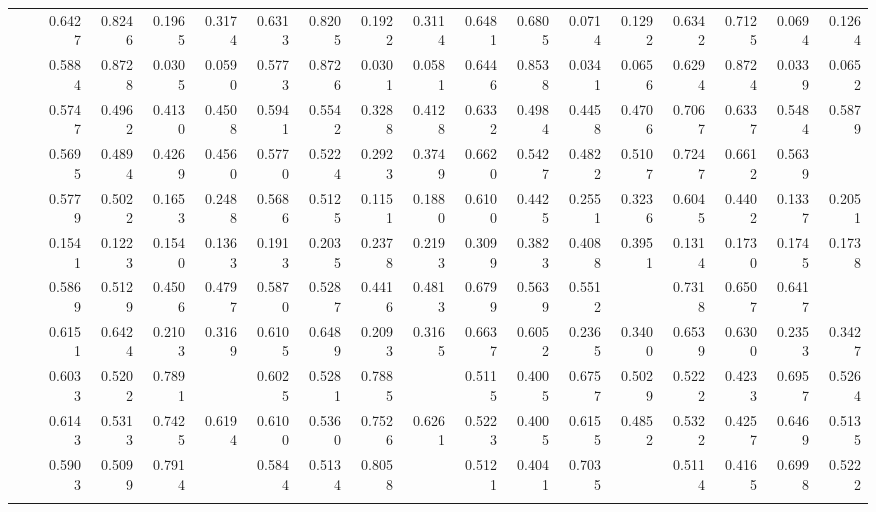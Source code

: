 \begin{table*}[t]
{\begin{tabular}{|l|l|r|r|r|r|r|r|r|r|r|r|r|r|r|r|r|r|}
			\comment{
				\multirow{11}{*}{\rotatebox{90}{\Cora}} 
				&\ATC        & 0.6427 & 0.8246 & 0.1965 & 0.3174 & 0.6313 & 0.8205 & 0.1922 & 0.3114 & 0.6481 & 0.6805 & 0.0714 & 0.1292 & 0.6342 & 0.7125 & 0.0694 & 0.1264 \\
				&\CTC        & 0.5884 & 0.8728 & 0.0305 & 0.0590 & 0.5773 & 0.8726 & 0.0301 & 0.0581 & 0.6446 & 0.8538 & 0.0341 & 0.0656 & 0.6294 & 0.8724 & 0.0339 & 0.0652 \\\cline{2-18}
				&\MAML       & 0.5747 & 0.4962 & 0.4130 & 0.4508 & 0.5941 & 0.5542 & 0.3288 & 0.4128 & 0.6332 & 0.4984 & 0.4458 & 0.4706 & 0.7067 & 0.6337 & 0.5484 & 0.5879 \\
				&\Reptile    & 0.5695 & 0.4894 & 0.4269 & 0.4560 & 0.5770 & 0.5224 & 0.2923 & 0.3749 & 0.6620 & 0.5427 & 0.4822 & 0.5107 &0.7247       & 0.6612       &0.5639        &\cellcolor{LightCyan}{0.6087}        \\
				&\Featrans  & 0.5779 & 0.5022 & 0.1653 & 0.2488 & 0.5686 & 0.5125 & 0.1151 & 0.1880 & 0.6100 & 0.4425 & 0.2551 & 0.3236 & 0.6045 & 0.4402 & 0.1337 & 0.2051 \\
				&\PN        & 0.1541 & 0.1223 & 0.1540 & 0.1363 & 0.1913 & 0.2035 & 0.2378 & 0.2193 & 0.3099 & 0.3823 & 0.4088 & 0.3951 & 0.1314 & 0.1730 & 0.1745 & 0.1738 \\\cline{2-18}
				&\Supervise & 0.5869 & 0.5129 & 0.4506 & 0.4797 & 0.5870 & 0.5287 & 0.4416 & 0.4813 & 0.6799 & 0.5639 & 0.5512 & \cellcolor{LightRed}{0.5575} & 0.7318 & 0.6507 & 0.6417 & \cellcolor{LightRed}{0.6462} \\
				&\ICSGNN    & 0.6151 & 0.6424 & 0.2103 & 0.3169 & 0.6105 & 0.6489 & 0.2093 & 0.3165 & 0.6637 & 0.6052 & 0.2365 & 0.3400 & 0.6539 & 0.6300 & 0.2353 & 0.3427 \\\cline{2-18}
				&\CGNPIP    & 0.6033 & 0.5202 & 0.7891 & \cellcolor{LightRed}{0.6271 } &0.6025 & 0.5281 & 0.7885 & \cellcolor{LightRed}{0.6325} & 0.5115 & 0.4005 & 0.6757 & 0.5029 & 0.5222 & 0.4233 & 0.6957 & 0.5264 \\
				&\CGNPMLP   & 0.6143 & 0.5313 & 0.7425 & 0.6194 & 0.6100 & 0.5360 & 0.7526 & 0.6261 & 0.5223 & 0.4005 & 0.6155 & 0.4852 & 0.5322 & 0.4257 & 0.6469 & 0.5135 \\
				&\CGNPGNN   & 0.5903 & 0.5099 & 0.7914 & \cellcolor{LightCyan}{0.6202} & 0.5844 & 0.5134 & 0.8058 & \cellcolor{LightCyan}{0.6272} & 0.5121 & 0.4041 & 0.7035 & \cellcolor{LightCyan}{0.5134} & 0.5114 & 0.4165 & 0.6998 & 0.5222\\\hline\hline
			}
			

\end{tabular}}
\end{table*}
